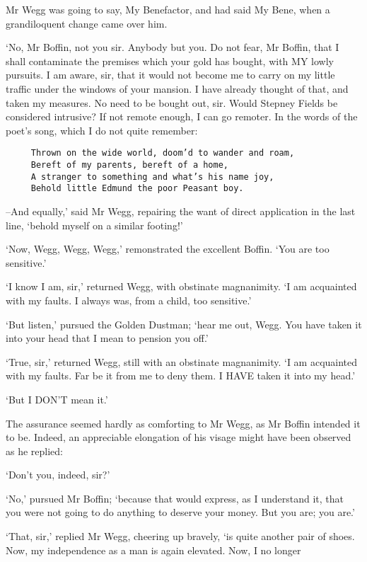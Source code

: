 Mr Wegg was going to say, My Benefactor, and had said My Bene, when a
grandiloquent change came over him.

‘No, Mr Boffin, not you sir. Anybody but you. Do not fear, Mr Boffin,
that I shall contaminate the premises which your gold has bought, with
MY lowly pursuits. I am aware, sir, that it would not become me to carry
on my little traffic under the windows of your mansion. I have already
thought of that, and taken my measures. No need to be bought out, sir.
Would Stepney Fields be considered intrusive? If not remote enough, I
can go remoter. In the words of the poet’s song, which I do not quite
remember:

\begin{verbatim}
     Thrown on the wide world, doom’d to wander and roam,
     Bereft of my parents, bereft of a home,
     A stranger to something and what’s his name joy,
     Behold little Edmund the poor Peasant boy.
\end{verbatim}

--And equally,’ said Mr Wegg, repairing the want of direct application
in the last line, ‘behold myself on a similar footing!’

‘Now, Wegg, Wegg, Wegg,’ remonstrated the excellent Boffin. ‘You are too
sensitive.’

‘I know I am, sir,’ returned Wegg, with obstinate magnanimity. ‘I am
acquainted with my faults. I always was, from a child, too sensitive.’

‘But listen,’ pursued the Golden Dustman; ‘hear me out, Wegg. You have
taken it into your head that I mean to pension you off.’

‘True, sir,’ returned Wegg, still with an obstinate magnanimity. ‘I am
acquainted with my faults. Far be it from me to deny them. I HAVE taken
it into my head.’

‘But I DON’T mean it.’

The assurance seemed hardly as comforting to Mr Wegg, as Mr Boffin
intended it to be. Indeed, an appreciable elongation of his visage might
have been observed as he replied:

‘Don’t you, indeed, sir?’

‘No,’ pursued Mr Boffin; ‘because that would express, as I understand
it, that you were not going to do anything to deserve your money. But
you are; you are.’

‘That, sir,’ replied Mr Wegg, cheering up bravely, ‘is quite another
pair of shoes. Now, my independence as a man is again elevated. Now, I
no longer

